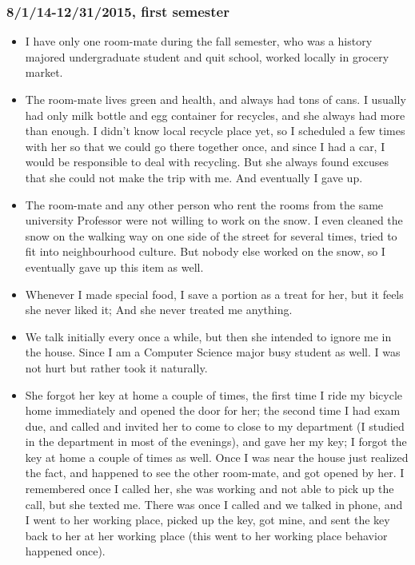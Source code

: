 \documentclass[9pt,b5paper]{article}
\begin{document}
\subsubsection{8/1/14-12/31/2015, first semester}
\label{sec-2-3-1}
\begin{itemize}
\item I have only one room-mate during the fall semester, who was a history majored undergraduate student and quit school, worked locally in grocery market.
\item The room-mate lives green and health, and always had tons of cans. I usually had only milk bottle and egg container for recycles, and she always had more than enough. I didn't know local recycle place yet, so I scheduled a few times with her so that we could go there together once, and since I had a car, I would be responsible to deal with recycling. But she always found excuses that she could not make the trip with me. And eventually I gave up.
\item The room-mate and any other person who rent the rooms from the same university Professor were not willing to work on the snow. I even cleaned the snow on the walking way on one side of the street for several times, tried to fit into neighbourhood culture. But nobody else worked on the snow, so I eventually gave up this item as well.
\item Whenever I made special food, I save a portion as a treat for her, but it feels she never liked it; And she never treated me anything.
\item We talk initially every once a while, but then she intended to ignore me in the house. Since I am a Computer Science major busy student as well. I was not hurt but rather took it naturally.
\item She forgot her key at home a couple of times, the first time I ride my bicycle home immediately and opened the door for her; the second time I had exam due, and called and invited her to come to close to my department (I studied in the department in most of the evenings), and gave her my key; I forgot the key at home a couple of times as well. Once I was near the house just realized the fact, and happened to see the other room-mate, and got opened by her. I remembered once I called her, she was working and not able to pick up the call, but she texted me. There was once I called and we talked in phone, and I went to her working place, picked up the key, got mine, and sent the key back to her at her working place (this went to her working place behavior happened once). 

\end{itemize}
\end{document}
